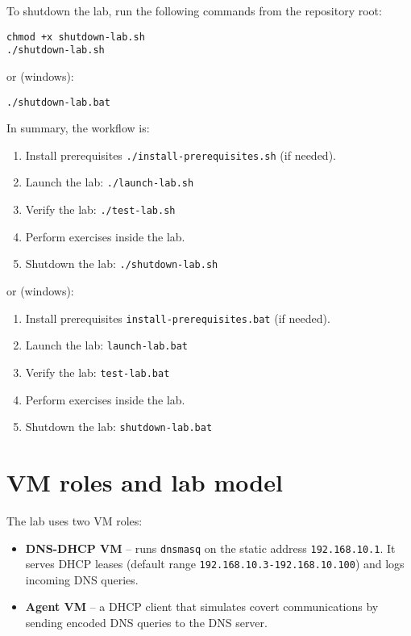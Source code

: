 \documentclass[11pt,a4paper]{article}
\begin{document}
To shutdown the lab, run the following commands from the repository root:
\begin{verbatim}
chmod +x shutdown-lab.sh
./shutdown-lab.sh
\end{verbatim}

or (windows):

\begin{verbatim}
./shutdown-lab.bat
\end{verbatim}

In summary, the workflow is:
\begin{enumerate}[noitemsep]
  \item Install prerequisites \texttt{./install-prerequisites.sh} (if needed).
  \item Launch the lab: \texttt{./launch-lab.sh}
  \item Verify the lab: \texttt{./test-lab.sh}
  \item Perform exercises inside the lab.
  \item Shutdown the lab: \texttt{./shutdown-lab.sh}
\end{enumerate}

or (windows):

\begin{enumerate}[noitemsep]
  \item Install prerequisites \texttt{install-prerequisites.bat} (if needed).
  \item Launch the lab: \texttt{launch-lab.bat}
  \item Verify the lab: \texttt{test-lab.bat}
  \item Perform exercises inside the lab.
  \item Shutdown the lab: \texttt{shutdown-lab.bat}
\end{enumerate}

\section{VM roles and lab model}
The lab uses two VM roles:

\begin{itemize}[noitemsep]
  \item \textbf{DNS-DHCP VM} -- runs \texttt{dnsmasq} on the static
    address \texttt{192.168.10.1}. It serves DHCP leases (default range
    \texttt{192.168.10.3-192.168.10.100}) and logs incoming DNS queries.
  \item \textbf{Agent VM} -- a DHCP client that simulates covert
    communications by sending encoded DNS queries to the DNS server.
\end{itemize}
\end{document}
